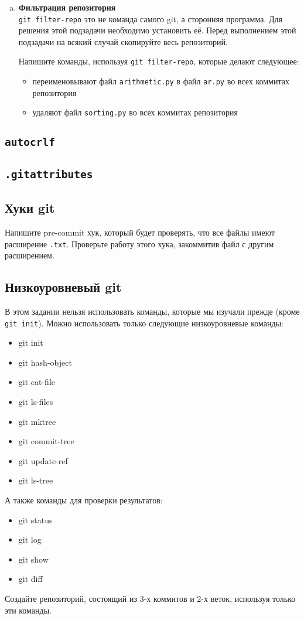 \documentclass{article}
\begin{document}
\begin{enumerate}[a.]
\item \textbf{Фильтрация репозитория}\\
\texttt{git filter-repo} это не команда самого git, а сторонняя программа. Для решения этой подзадачи необходимо установить её. Перед выполнением этой подзадачи на всякий случай скопируйте весь репозиторий. 

Напишите команды, используя \texttt{git filter-repo}, которые делают следующее:
\begin{itemize}
\item переименовывают файл \texttt{arithmetic.py} в файл \texttt{ar.py} во всех коммитах репозитория
\item удаляют файл \texttt{sorting.py} во всех коммитах репозитория
\end{itemize}
\end{enumerate}


\subsection{\texttt{autocrlf}}
\subsection{\texttt{.gitattributes}}
\subsection{Хуки git}
Напишите pre-commit хук, который будет проверять, что все файлы имеют расширение \texttt{.txt}. Проверьте работу этого хука, закоммитив файл с другим расширением.


\subsection{Низкоуровневый git}
В этом задании нельзя использовать команды, которые мы изучали прежде (кроме \texttt{git init}). Можно использовать только следующие низкоуровневые команды:
\begin{itemize}
\item git init
\item git hash-object
\item git cat-file
\item git ls-files
\item git mktree
\item git commit-tree
\item git update-ref 
\item git ls-tree
\end{itemize}
А также команды для проверки результатов:
\begin{itemize}
\item git status
\item git log
\item git show
\item git diff
\end{itemize}
Создайте репозиторий, состоящий из 3-х коммитов и 2-х веток, используя только эти команды.
\end{document}
